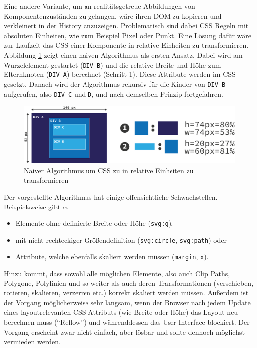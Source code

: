 \documentclass[
	headsepline,
	footsepline,
	fontsize=12pt,
	bibliography=totoc
]{scrbook}
\begin{document}

Eine andere Variante, um an realitätsgetreue Abbildungen von Komponentenzuständen zu gelangen, wäre ihren DOM zu kopieren und verkleinert in der History anzuzeigen. Problematisch sind dabei CSS Regeln mit absoluten Einheiten, wie zum Beispiel Pixel oder Punkt. Eine Lösung dafür wäre zur Laufzeit das CSS einer Komponente in relative Einheiten zu transformieren. Abbildung \ref{figure:transform-css} zeigt  einen naiven Algorithmus als ersten Ansatz. Dabei wird am Wurzelelement gestartet (\texttt{DIV B}) und die relative Breite und Höhe zum Elternknoten (\texttt{DIV A}) berechnet (Schritt 1). Diese Attribute werden im CSS gesetzt. Danach wird der Algorithmus rekursiv für die Kinder von \texttt{DIV B} aufgerufen, also \texttt{DIV C} und \texttt{D}, und nach demselben Prinzip fortgefahren.

\begin{figure}[htbp]
   \centering
   \includegraphics[width=\textwidth]{images/konzeption-transform-css.png}
   \caption{Naiver Algorithmus um CSS zu in relative Einheiten zu transformieren}
   \label{figure:transform-css}
\end{figure}

Der vorgestellte Algorithmus hat einige offensichtliche Schwachstellen. Beispielsweise gibt es 

\begin{itemize}
	\item Elemente ohne definierte Breite oder Höhe (\texttt{svg:g}), 
	\item mit nicht-rechteckiger Größendefinition (\texttt{svg:circle}, \texttt{svg:path}) oder
	\item Attribute, welche ebenfalls skaliert werden müssen (\texttt{margin}, \texttt{x}).
\end{itemize}

Hinzu kommt, dass sowohl alle möglichen Elemente, also auch Clip Paths, Polygone, Polylinien und so weiter als auch deren Transformationen (verschieben, rotieren, skalieren, verzerren etc.) korrekt skaliert werden müssen. Außerdem ist der Vorgang möglicherweise sehr langsam, wenn der Browser nach jedem Update eines layoutrelevanten CSS Attributs (wie Breite oder Höhe) das Layout neu berechnen muss (\enquote{Reflow}) und währenddessen das User Interface blockiert. Der Vorgang erscheint zwar nicht einfach, aber lösbar und sollte dennoch möglichst vermieden werden.
\end{document}
